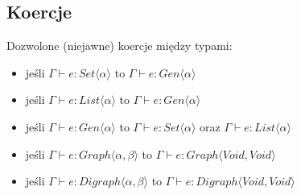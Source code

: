 \documentclass[thesis.tex]{subfiles}
\begin{document}
\subsection{Koercje}
Dozwolone (niejawne) koercje między typami:
\begin{itemize}
    \item jeśli $\Gamma \vdash e : Set\langle \alpha \rangle$ to
        $\Gamma \vdash e : Gen\langle \alpha \rangle$
    \item jeśli $\Gamma \vdash e : List\langle \alpha \rangle$ to
        $\Gamma \vdash e : Gen\langle \alpha \rangle$
    \item jeśli $\Gamma \vdash e : Gen\langle \alpha \rangle$ to
        $\Gamma \vdash e : Set\langle \alpha \rangle$ oraz
        $\Gamma \vdash e : List\langle \alpha \rangle$
    \item jeśli $\Gamma \vdash e : Graph\langle \alpha, \beta \rangle$ to
        $\Gamma \vdash e : Graph\langle Void, Void \rangle$
    \item jeśli $\Gamma \vdash e : Digraph\langle \alpha, \beta \rangle$ to
        $\Gamma \vdash e : Digraph\langle Void, Void \rangle$
\end{itemize}
\end{document}
